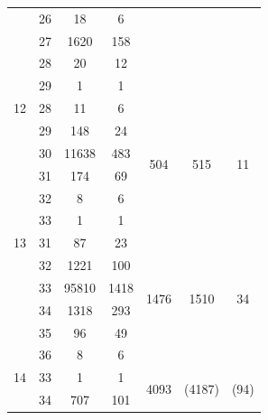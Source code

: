 \begin{table}[htbp]
{\begin{threeparttable}[para]
\begin{tabular}{clccccc}
       & 26  & 18     				& 6    &                       &                       &                     \\
            & 27  & 1620\tnote{a}	& 158  &                       &                       &                     \\
       & 28  & 20     				& 12   &                       &                       &                     \\
       & 29  & 1      				& 1    &                       &                       &                     \\  \midrule
    12 & 28  & 11     				& 6    & \multirow{6}{*}{504}  & \multirow{6}{*}{515}  & \multirow{6}{*}{11} \\
       & 29  & 148    				& 24   &                       &                       &                     \\
       & 30  & 11638  				& 483  &                       &                       &                     \\
       & 31  & 174    				& 69   &                       &                       &                     \\
       & 32  & 8      				& 6    &                       &                       &                     \\
       & 33  & 1      				& 1    &                       &                       &                     \\  \midrule
    13 & 31  & 87     				& 23   & \multirow{6}{*}{1476} & \multirow{6}{*}{1510} & \multirow{6}{*}{34} \\
       & 32  & 1221   				& 100  &                       &                       &                     \\
            & 33  & 95810\tnote{a}& 1418 &                       &                       &                     \\
            & 34  & 1318\tnote{a} & 293  &                       &                       &                     \\
       & 35  & 96     				& 49   &                       &                       &                     \\
       & 36  & 8      				& 6    &                       &                       &                     \\  \midrule
            14 & 33  & 1      				& 1    & \multirow{8}{*}{4093} & \multirow{8}{*}{(4187)\tnote{b}}    & \multirow{8}{*}{(94)\tnote{b}}  \\
       & 34  & 707    				& 101  &                       &                       &                     \\

\end{tabular}
\end{threeparttable}}
\end{table}
